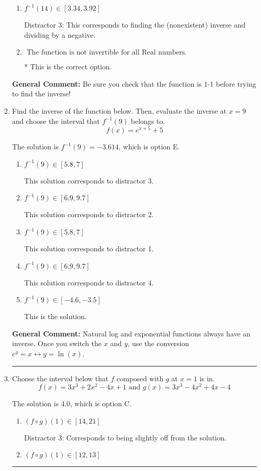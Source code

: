 \documentclass{extbook}[14pt]
\newcommand{\litem}[1]{\item #1

\rule{\textwidth}{0.4pt}}
\begin{document}
\begin{enumerate}
{\begin{enumerate}[label=\Alph*.]
 Distractor 4: This corresponds to both distractors 2 and 3.
\item \( f^{-1}(14) \in [3.34, 3.92] \)

 Distractor 3: This corresponds to finding the (nonexistent) inverse and dividing by a negative.
\item \( \text{ The function is not invertible for all Real numbers. } \)

* This is the correct option.
\end{enumerate}

\textbf{General Comment:} Be sure you check that the function is 1-1 before trying to find the inverse!
}
\litem{
Find the inverse of the function below. Then, evaluate the inverse at $x = 9$ and choose the interval that $f^{-1}(9)$ belongs to.
\[ f(x) = e^{x+5}+5 \]

The solution is \( f^{-1}(9) = -3.614 \), which is option E.\begin{enumerate}[label=\Alph*.]
\item \( f^{-1}(9) \in [5.8, 7] \)

 This solution corresponds to distractor 3.
\item \( f^{-1}(9) \in [6.9, 9.7] \)

 This solution corresponds to distractor 2.
\item \( f^{-1}(9) \in [5.8, 7] \)

 This solution corresponds to distractor 1.
\item \( f^{-1}(9) \in [6.9, 9.7] \)

 This solution corresponds to distractor 4.
\item \( f^{-1}(9) \in [-4.6, -3.5] \)

 This is the solution.
\end{enumerate}

\textbf{General Comment:} Natural log and exponential functions always have an inverse. Once you switch the $x$ and $y$, use the conversion $ e^y = x \leftrightarrow y=\ln(x)$.
}
\litem{
Choose the interval below that $f$ composed with $g$ at $x=1$ is in.
\[ f(x) = 3x^{3} +2 x^{2} -4 x + 1 \text{ and } g(x) = 3x^{3} -4 x^{2} +4 x -4 \]

The solution is \( 4.0 \), which is option C.\begin{enumerate}[label=\Alph*.]
\item \( (f \circ g)(1) \in [14, 21] \)

 Distractor 3: Corresponds to being slightly off from the solution.
\item \( (f \circ g)(1) \in [12, 13] \)


\end{enumerate}}
\end{enumerate}
\end{document}
